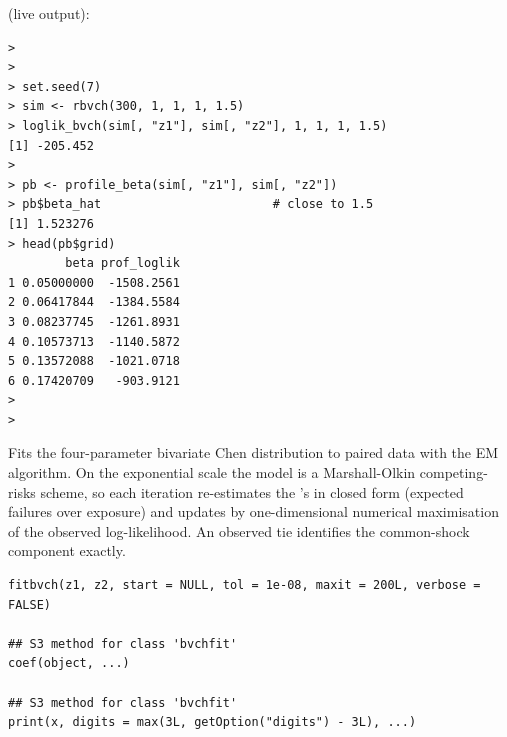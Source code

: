 \documentclass[11pt,a4paper]{article}
\begin{document}
\vspace{0.8em}
 (live output):
\begin{lstlisting}
> 
> 
> set.seed(7)
> sim <- rbvch(300, 1, 1, 1, 1.5)
> loglik_bvch(sim[, "z1"], sim[, "z2"], 1, 1, 1, 1.5)
[1] -205.452
> 
> pb <- profile_beta(sim[, "z1"], sim[, "z2"])
> pb$beta_hat                        # close to 1.5
[1] 1.523276
> head(pb$grid)
        beta prof_loglik
1 0.05000000  -1508.2561
2 0.06417844  -1384.5584
3 0.08237745  -1261.8931
4 0.10573713  -1140.5872
5 0.13572088  -1021.0718
6 0.17420709   -903.9121
> 
> 
\end{lstlisting}


\newpage

%
\begin{Description}
Fits the four-parameter bivariate Chen distribution
 to paired data with the
EM algorithm.  On the exponential scale  the
model is a Marshall-Olkin competing-risks scheme, so each
iteration re-estimates the \eqn{\alpha}{}'s in closed form
(expected failures over exposure) and updates \eqn{\beta}{} by
one-dimensional numerical maximisation of the observed
log-likelihood.  An observed tie  identifies
the common-shock component exactly.
\end{Description}
%
\begin{Usage}
\begin{verbatim}
fitbvch(z1, z2, start = NULL, tol = 1e-08, maxit = 200L, verbose = FALSE)

## S3 method for class 'bvchfit'
coef(object, ...)

## S3 method for class 'bvchfit'
print(x, digits = max(3L, getOption("digits") - 3L), ...)
\end{verbatim}
\end{Usage}
%
\end{document}
